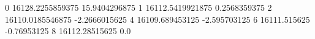 0 16128.2255859375 15.9404296875
1 16112.5419921875 0.2568359375
2 16110.0185546875 -2.2666015625
4 16109.689453125 -2.595703125
6 16111.515625 -0.76953125
8 16112.28515625 0.0
